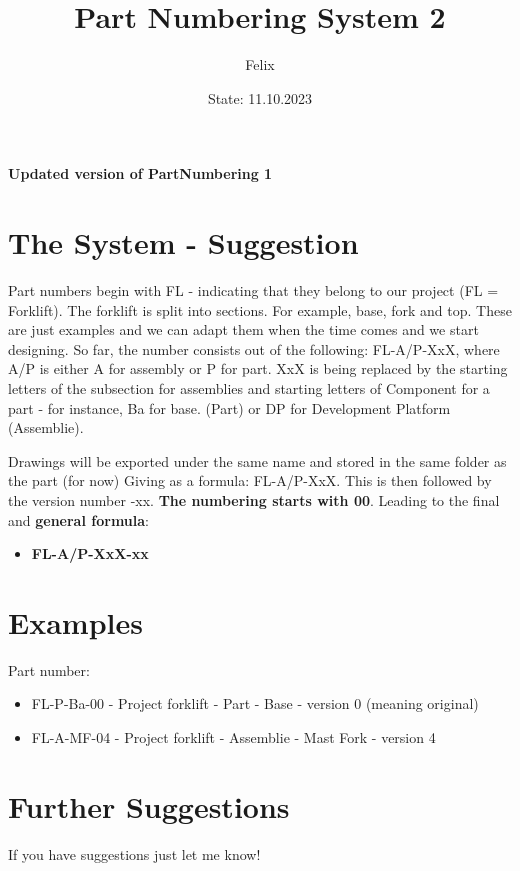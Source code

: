 \documentclass{article}
\title{Part Numbering System 2}
\author{Felix}
\date{State: 11.10.2023}
\begin{document}
    \maketitle
    \textbf{Updated version of PartNumbering 1}
    \section*{The System - Suggestion}
    Part numbers begin with FL - indicating that they belong to our project (FL = Forklift). 
    The forklift is split into sections. For example, base, fork and top. These are just
    examples and we can adapt them when the time comes and we start designing.
    So far, the number consists out of the following: FL-A/P-XxX, where A/P is either A for assembly or P for part. 
    XxX is being replaced by the starting
    letters  of the subsection for assemblies and starting letters of Component for a part - for instance, Ba for base. (Part)
    or DP for Development Platform (Assemblie).
    
    Drawings will be exported under the same name and stored in the same folder as the part (for now)
    Giving as a formula:
    FL-A/P-XxX. This is then followed by the version number -xx. \textbf{The numbering starts with 00}. Leading to the final 
    and \textbf{general formula}:

    \begin{itemize}
        \item \textbf{FL-A/P-XxX-xx}
    \end{itemize}

    \section{Examples}
    Part number: 
    \begin{itemize}
        \item FL-P-Ba-00 - Project forklift - Part - Base - version 0 (meaning original)
        \item FL-A-MF-04 - Project forklift - Assemblie - Mast Fork - version 4
    \end{itemize}

    \section*{Further Suggestions}
    If you have suggestions just let me know!    
\end{document}
